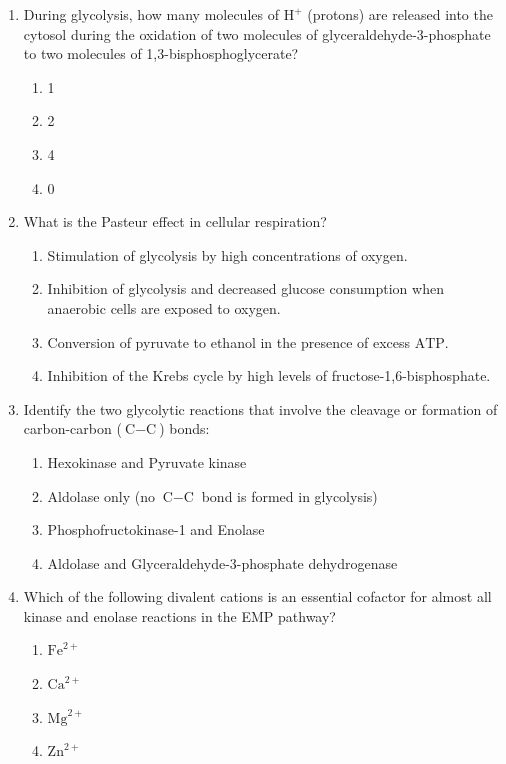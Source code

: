 \documentclass[11pt, a4paper]{article}
\begin{document}
\begin{enumerate}[label=\textbf{\arabic*.}]
\item During glycolysis, how many molecules of $\text{H}^+$ (protons) are released into the cytosol during the oxidation of two molecules of glyceraldehyde-3-phosphate to two molecules of 1,3-bisphosphoglycerate?
\begin{enumerate}[label=(\Alph*)]
    \item 1
    \item 2
    \item 4
    \item 0
\end{enumerate}

\item What is the Pasteur effect in cellular respiration?
\begin{enumerate}[label=(\Alph*)]
    \item Stimulation of glycolysis by high concentrations of oxygen.
    \item Inhibition of glycolysis and decreased glucose consumption when anaerobic cells are exposed to oxygen.
    \item Conversion of pyruvate to ethanol in the presence of excess $\text{ATP}$.
    \item Inhibition of the Krebs cycle by high levels of fructose-1,6-bisphosphate.
\end{enumerate}

\item Identify the two glycolytic reactions that involve the cleavage or formation of carbon-carbon ($\text{C}-\text{C}$) bonds:
\begin{enumerate}[label=(\Alph*)]
    \item Hexokinase and Pyruvate kinase
    \item Aldolase only (no $\text{C}-\text{C}$ bond is formed in glycolysis)
    \item Phosphofructokinase-1 and Enolase
    \item Aldolase and Glyceraldehyde-3-phosphate dehydrogenase
\end{enumerate}

\item Which of the following divalent cations is an essential cofactor for almost all kinase and enolase reactions in the EMP pathway?
\begin{enumerate}[label=(\Alph*)]
    \item $\text{Fe}^{2+}$
    \item $\text{Ca}^{2+}$
    \item $\text{Mg}^{2+}$
    \item $\text{Zn}^{2+}$
\end{enumerate}


\end{enumerate}
\end{document}
